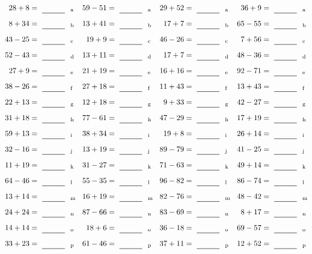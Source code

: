 \documentclass
[
  draft    = true,
  fontsize = 11pt,
  parskip  = half-
]
{scrartcl}
\begin{document}
\clearpage
\begin{align*}
    \pline{28+8}&=\rline{a}
  & \pline{59-51}&=\rline{a}
  & \pline{29+52}&=\rline{a}
  & \pline{36+9}&=\rline{a} \\[1ex]
    \pline{8+34}&=\rline{b}
  & \pline{13+41}&=\rline{b}
  & \pline{17+7}&=\rline{b}
  & \pline{65-55}&=\rline{b} \\[1ex]
    \pline{43-25}&=\rline{c}
  & \pline{19+9}&=\rline{c}
  & \pline{46-26}&=\rline{c}
  & \pline{7+56}&=\rline{c} \\[1ex]
    \pline{52-43}&=\rline{d}
  & \pline{13+11}&=\rline{d}
  & \pline{17+7}&=\rline{d}
  & \pline{48-36}&=\rline{d} \\[1ex]
    \pline{27+9}&=\rline{e}
  & \pline{21+19}&=\rline{e}
  & \pline{16+16}&=\rline{e}
  & \pline{92-71}&=\rline{e} \\[1ex]
    \pline{38-26}&=\rline{f}
  & \pline{27+18}&=\rline{f}
  & \pline{11+43}&=\rline{f}
  & \pline{13+43}&=\rline{f} \\[1ex]
    \pline{22+13}&=\rline{g}
  & \pline{12+18}&=\rline{g}
  & \pline{9+33}&=\rline{g}
  & \pline{42-27}&=\rline{g} \\[1ex]
    \pline{31+18}&=\rline{h}
  & \pline{77-61}&=\rline{h}
  & \pline{47-29}&=\rline{h}
  & \pline{17+19}&=\rline{h} \\[1ex]
    \pline{59+13}&=\rline{i}
  & \pline{38+34}&=\rline{i}
  & \pline{19+8}&=\rline{i}
  & \pline{26+14}&=\rline{i} \\[1ex]
    \pline{32-16}&=\rline{j}
  & \pline{13+19}&=\rline{j}
  & \pline{89-79}&=\rline{j}
  & \pline{41-25}&=\rline{j} \\[1ex]
    \pline{11+19}&=\rline{k}
  & \pline{31-27}&=\rline{k}
  & \pline{71-63}&=\rline{k}
  & \pline{49+14}&=\rline{k} \\[1ex]
    \pline{64-46}&=\rline{l}
  & \pline{55-35}&=\rline{l}
  & \pline{96-82}&=\rline{l}
  & \pline{86-74}&=\rline{l} \\[1ex]
    \pline{13+14}&=\rline{m}
  & \pline{16+19}&=\rline{m}
  & \pline{82-76}&=\rline{m}
  & \pline{48-42}&=\rline{m} \\[1ex]
    \pline{24+24}&=\rline{n}
  & \pline{87-66}&=\rline{n}
  & \pline{83-69}&=\rline{n}
  & \pline{8+17}&=\rline{n} \\[1ex]
    \pline{14+14}&=\rline{o}
  & \pline{18+6}&=\rline{o}
  & \pline{36-18}&=\rline{o}
  & \pline{69-57}&=\rline{o} \\[1ex]
    \pline{33+23}&=\rline{p}
  & \pline{61-46}&=\rline{p}
  & \pline{37+11}&=\rline{p}
  & \pline{12+52}&=\rline{p}
\end{align*}
\end{document}
